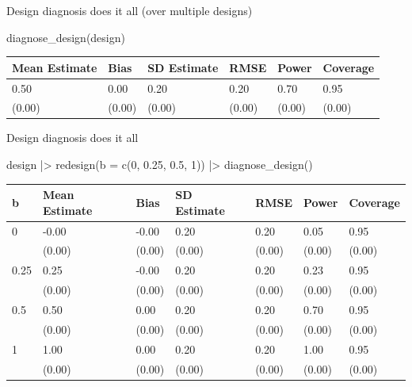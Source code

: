 \documentclass[
  11pt,
  ignorenonframetext,
]{beamer}
\newenvironment{Shaded}{\begin{snugshade}}{\end{snugshade}}
\newcommand{\AttributeTok}[1]{\textcolor[rgb]{0.40,0.45,0.13}{#1}}
\newcommand{\DecValTok}[1]{\textcolor[rgb]{0.68,0.00,0.00}{#1}}
\newcommand{\FloatTok}[1]{\textcolor[rgb]{0.68,0.00,0.00}{#1}}
\newcommand{\FunctionTok}[1]{\textcolor[rgb]{0.28,0.35,0.67}{#1}}
\newcommand{\NormalTok}[1]{\textcolor[rgb]{0.00,0.23,0.31}{#1}}
\newcommand{\SpecialCharTok}[1]{\textcolor[rgb]{0.37,0.37,0.37}{#1}}
\begin{document}
\begin{frame}[fragile]{Design diagnosis does it all (over multiple
designs)}
\protect\hypertarget{design-diagnosis-does-it-all-over-multiple-designs-1}{}
\begin{Shaded}
\begin{Highlighting}[]
  \FunctionTok{diagnose\_design}\NormalTok{(design)}
\end{Highlighting}
\end{Shaded}

\begin{tabular}{l|l|l|l|l|l}
\hline
Mean Estimate & Bias & SD Estimate & RMSE & Power & Coverage\\
\hline
0.50 & 0.00 & 0.20 & 0.20 & 0.70 & 0.95\\
\hline
(0.00) & (0.00) & (0.00) & (0.00) & (0.00) & (0.00)\\
\hline
\end{tabular}
\end{frame}

\begin{frame}[fragile]{Design diagnosis does it all}
\protect\hypertarget{design-diagnosis-does-it-all-1}{}
\begin{Shaded}
\begin{Highlighting}[]
\NormalTok{design }\SpecialCharTok{|\textgreater{}}
  \FunctionTok{redesign}\NormalTok{(}\AttributeTok{b =} \FunctionTok{c}\NormalTok{(}\DecValTok{0}\NormalTok{, }\FloatTok{0.25}\NormalTok{, }\FloatTok{0.5}\NormalTok{, }\DecValTok{1}\NormalTok{)) }\SpecialCharTok{|\textgreater{}}
  \FunctionTok{diagnose\_design}\NormalTok{()}
\end{Highlighting}
\end{Shaded}

\begin{tabular}{l|l|l|l|l|l|l}
\hline
b & Mean Estimate & Bias & SD Estimate & RMSE & Power & Coverage\\
\hline
0 & -0.00 & -0.00 & 0.20 & 0.20 & 0.05 & 0.95\\
\hline
 & (0.00) & (0.00) & (0.00) & (0.00) & (0.00) & (0.00)\\
\hline
0.25 & 0.25 & -0.00 & 0.20 & 0.20 & 0.23 & 0.95\\
\hline
 & (0.00) & (0.00) & (0.00) & (0.00) & (0.00) & (0.00)\\
\hline
0.5 & 0.50 & 0.00 & 0.20 & 0.20 & 0.70 & 0.95\\
\hline
 & (0.00) & (0.00) & (0.00) & (0.00) & (0.00) & (0.00)\\
\hline
1 & 1.00 & 0.00 & 0.20 & 0.20 & 1.00 & 0.95\\
\hline
 & (0.00) & (0.00) & (0.00) & (0.00) & (0.00) & (0.00)\\
\hline
\end{tabular}
\end{frame}
\end{document}
